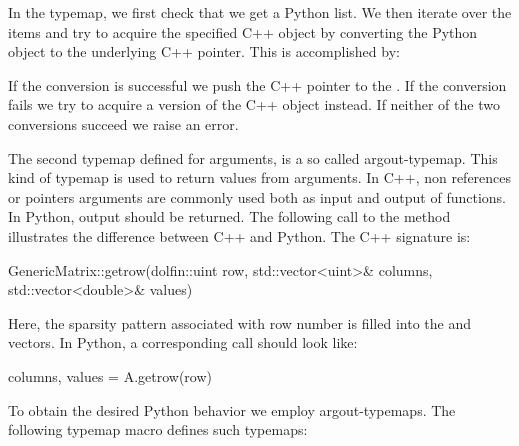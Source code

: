 In the typemap, we first check that we get a Python list. We then iterate
over the items and try to acquire the specified C++ object by converting
the Python object to the underlying C++ pointer. This is accomplished by:
If the conversion is successful we push the C++ pointer to
the . If the conversion fails we try to acquire a
 version of the C++ object instead. If neither of the
two conversions succeed we raise an error.

The second typemap defined for  arguments, is a so
called argout-typemap. This kind of typemap is used to return values from
arguments. In C++, non  references or pointers arguments are
commonly used both as input and output of functions. In Python, output
should be returned.  The following call to the 
method illustrates the difference between C++ and Python. The C++
signature is:
\begin{swigcode}
GenericMatrix::getrow(dolfin::uint row, std::vector<uint>& columns, std::vector<double>& values)
\end{swigcode}
Here, the sparsity pattern associated with row number  is
filled into the  and  vectors.  In Python, a
corresponding call should look like:
\begin{python}
columns, values = A.getrow(row)
\end{python}
To obtain the desired Python behavior we employ argout-typemaps. The
following typemap macro defines such typemaps:
